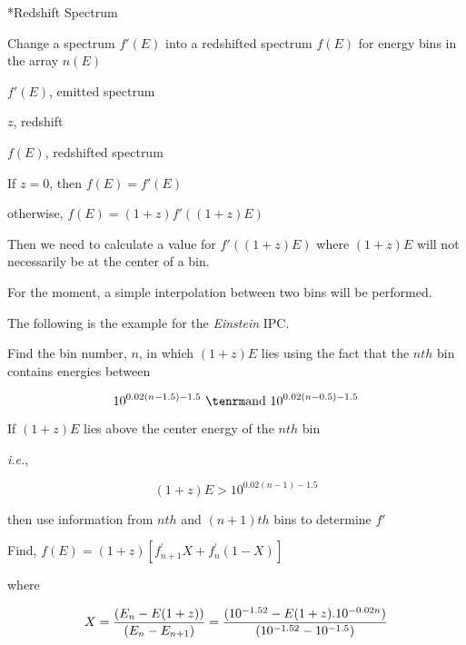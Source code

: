 {\parindent \vbox{}}

 
\**Redshift Spectrum

{\list


Change a spectrum $f'(E)$ into a redshifted spectrum $f(E)$ for energy
bins in the array $n(E)$

 
$f'(E)$, emitted spectrum

$z$, redshift
 

$f(E)$, redshifted spectrum


If $z=0$, then $f(E) = f'(E)$

otherwise, $f(E) = (1+z) f'((1+z)E)$

Then we need to calculate a value for $f'((1+z)E)$ where $(1+z)E$ will not
necessarily be at the center of a bin.

For the moment, a simple interpolation between two bins will be performed.

The following is the example for the {\it Einstein} IPC.

Find the bin number, $n$, in which $(1+z)E$ lies using the fact that the $nth$
bin contains energies between

}

$$10^{0.02(n-1.5)-1.5}~ {\rm and}~ 10^{0.02(n-0.5)-1.5}$$

{\list

If $(1+z)E$ lies above the center energy of the $nth$ bin

{\it i.e.},

}

$$(1+z)E > 10^{0.02(n-1)-1.5}$$

{\list

then use information from $nth$ and $(n+1)th$ bins to determine $f'$

Find, $f(E) = (1 + z) \left[ f^{\prime}_{n+1} X + f^{\prime}_{n}(1-X) \right]$

where

}

$$X = {(E_{n}-E(1+z))\over (E_{n}-E_{n+1})} = {(10^{-1.52}- 
E(1+z).10^{-0.02n})\over (10^{-1.52}-10^{-1.5})}$$

